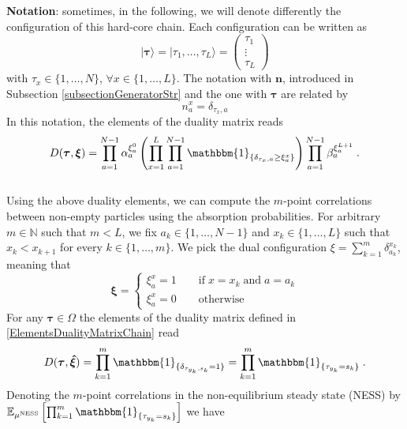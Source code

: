 \documentclass[10pt]{article}
\numberwithin{equation}{section}
\numberwithin{equation}{subsection}
\newcommand{\dt}{\;.}
\begin{document}
\textbf{Notation}: sometimes, in the following, we will denote differently the configuration of this hard-core chain. Each configuration can be written as
\begin{equation}\label{Tau-Notation}
	|\bm{\tau}\rangle=|\tau_{1},\ldots,\tau_{L}\rangle =\begin{pmatrix}
		\tau_{1}\\
		\vdots\\
		\tau_{L}
	\end{pmatrix}
\end{equation} 
with $\tau_{x}\in \{1,\ldots,N\}$, $\forall x\in \{1,\ldots,L\}$. The notation with $\bm{n}$, introduced in Subsection \ref{subsectionGeneratorStr} and the one with $\bm{\tau}$ are related by 
\begin{equation}\label{notation-change-relation}
	n_{a}^{x}=\delta_{\tau_{x},a}
\end{equation}
In this notation, the elements of the duality matrix reads
\begin{equation}\label{ElementsDualityMatrixChain_1}
	D(\bm{\tau},\bm{\xi})=\prod_{a=1}^{N-1}\alpha_{a}^{\xi_{a}^{0}}\left(\prod_{x=1}^{L}\prod_{a=1}^{N-1}\mathbbm{1}_{\{\delta_{\tau_{x},a}\geq \xi_{a}^{x}\}}\right)\prod_{a=1}^{N-1}\beta_{a}^{\xi_{a}^{L+1}}\dt
\end{equation}
\\
Using the above duality elements, we can compute the  $m$-point correlations between non-empty particles using the absorption probabilities. For arbitrary $m\in \mathbb{N}$ such that $m<L$, we fix $a_{k}\in\{1,\ldots,N-1\}$ and $x_{k}\in\{1,\ldots,L\}$ such that $x_{k}<x_{k+1}$ for every $k\in\{1,\ldots,m\}$. We pick the dual configuration $\xi=\sum_{k=1}^{m}\delta_{a_{k}}^{x_{k}}$, meaning that 
\begin{equation}
	\bm{\xi}=\begin{cases}
		\xi_{a}^{x}=1\qquad \text{if}\;x=x_{k}\;\text{and}\; a=a_{k}\\
		\xi_{a}^{x}=0\qquad \text{otherwise}
	\end{cases}
\end{equation}
For any $\bm{\tau}\in \Omega$ the elements of the duality matrix defined in \eqref{ElementsDualityMatrixChain} read
\begin{equation}
	D(\bm{\tau},\bm{\hat{\xi}})=\prod_{k=1}^{m}\mathbbm{1}_{\{\delta_{\tau_{y_{k}},s_{k}}=1\}}=\prod_{k=1}^{m}\mathbbm{1}_{\{\tau_{y_{k}}=s_{k}\}}\dt
\end{equation}
Denoting the $m$-point correlations in the non-equilibrium steady state (NESS) by $\mathbb{E}_{\mu^{\text{NESS}}}\left[\prod_{k=1}^{m}\mathbbm{1}_{\{\tau_{y_{k}}=s_{k}\}}\right]$ we have 
\end{document}
